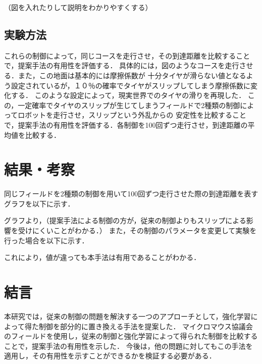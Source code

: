 \documentclass[a4paper,11pt]{jsarticle}
\begin{document}
（図を入れたりして説明をわかりやすくする）
\subsection{実験方法}
これらの制御によって，同じコースを走行させ，その到達距離を比較することで，提案手法の有用性を評価する．
具体的には，図のようなコースを走行させる．また，この地面は基本的には摩擦係数が
十分タイヤが滑らない値となるよう設定されているが，１０％の確率でタイヤがスリップしてしまう摩擦係数に変化する．
このような設定によって，現実世界でのタイヤの滑りを再現した．
この，一定確率でタイヤのスリップが生じてしまうフィールドで2種類の制御によってロボットを走行させ，スリップという外乱からの
安定性を比較することで，提案手法の有用性を評価する．各制御を100回ずつ走行させ，到達距離の平均値を比較する．


\section{結果・考察}
同じフィールドを2種類の制御を用いて100回ずつ走行させた際の到達距離を表すグラフを以下に示す．


グラフより，（提案手法による制御の方が，従来の制御よりもスリップによる影響を受けにくいことがわかる．）
また，その制御のパラメータを変更して実験を行った場合を以下に示す．

これにより，値が違っても本手法は有用であることがわかる．
\section{結言}
本研究では，従来の制御の問題を解決する一つのアプローチとして，強化学習によって得た制御を部分的に置き換える手法を提案した．
マイクロマウス協議会のフィールドを使用し，従来の制御と強化学習によって得られた制御を比較することで，提案手法の有用性を示した．
今後は，他の問題に対してもこの手法を適用し，その有用性を示すことができるかを検証する必要がある．
\end{document}
